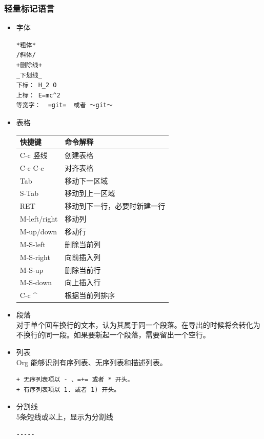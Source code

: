\documentclass[11pt]{article}
\begin{document}
\subsubsection{轻量标记语言}
\label{sec-6-2-2}
\begin{itemize}

\item 字体\\
\label{sec-6-2-2-1}%
\begin{verbatim}
*粗体*
/斜体/
+删除线+
_下划线_
下标： H_2 O
上标： E=mc^2
等宽字：  =git=  或者 ～git～
\end{verbatim}

\item 表格\\
\label{sec-6-2-2-2}%
\begin{center}
\begin{tabular}{ll}
 快捷键        &  命令解释                      \\
\hline
 C-c 竖线      &  创建表格                      \\
 C-c C-c       &  对齐表格                      \\
 Tab           &  移动下一区域                  \\
 S-Tab         &  移动到上一区域                \\
 RET           &  移动到下一行，必要时新建一行  \\
 M-left/right  &  移动列                        \\
 M-up/down     &  移动行                        \\
 M-S-left      &  删除当前列                    \\
 M-S-right     &  向前插入列                    \\
 M-S-up        &  删除当前行                    \\
 M-S-down      &  向上插入行                    \\
 C-c \^{}      &  根据当前列排序                \\
\end{tabular}
\end{center}



\item 段落\\
\label{sec-6-2-2-3}%
对于单个回车换行的文本，认为其属于同一个段落。在导出的时候将会转化为不换行的同一段。如果要新起一个段落，需要留出一个空行。

\item 列表\\
\label{sec-6-2-2-4}%
Org 能够识别有序列表、无序列表和描述列表。

\begin{verbatim}
+ 无序列表项以 - 、=+= 或者 * 开头。
+ 有序列表项以 1. 或者 1) 开头。
\end{verbatim}

\item 分割线\\
\label{sec-6-2-2-5}%
5条短线或以上，显示为分割线

\begin{verbatim}
-----
\end{verbatim}

\end{itemize} %
\end{document}
